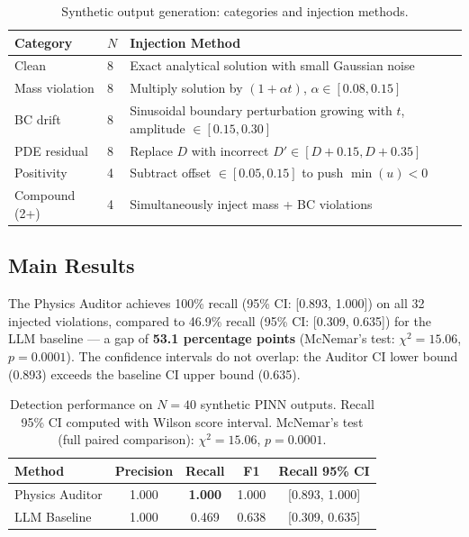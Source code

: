 \documentclass{article}
\begin{document}
\begin{table}[t]
  \caption{Synthetic output generation: categories and injection methods.}
  \label{tab:distribution}
  \centering
  \begin{tabular}{llp{7cm}}
    \toprule
    Category & $N$ & Injection Method \\
    \midrule
    Clean        & 8 & Exact analytical solution with small Gaussian noise \\
    Mass violation & 8 & Multiply solution by $(1 + \alpha t)$, $\alpha\in[0.08,0.15]$ \\
    BC drift     & 8 & Sinusoidal boundary perturbation growing with $t$, amplitude $\in[0.15,0.30]$ \\
    PDE residual & 8 & Replace $D$ with incorrect $D'\in[D+0.15, D+0.35]$ \\
    Positivity   & 4 & Subtract offset $\in[0.05, 0.15]$ to push $\min(u)<0$ \\
    Compound (2+)& 4 & Simultaneously inject mass + BC violations \\
    \bottomrule
  \end{tabular}
\end{table}

\subsection{Main Results}

The Physics Auditor achieves 100\% recall (95\% CI: [0.893, 1.000]) on all
32 injected violations, compared to 46.9\% recall (95\% CI: [0.309, 0.635])
for the LLM baseline --- a gap of \textbf{53.1 percentage points}
(McNemar's test: $\chi^2 = 15.06$, $p = 0.0001$).
The confidence intervals do not overlap: the Auditor CI lower bound (0.893)
exceeds the baseline CI upper bound (0.635).

\begin{table}[t]
  \caption{Detection performance on $N=40$ synthetic PINN outputs.
    Recall 95\% CI computed with Wilson score interval.
    McNemar's test (full paired comparison):
    $\chi^2 = 15.06$, $p = 0.0001$.}
  \label{tab:main}
  \centering
  \begin{tabular}{lcccc}
    \toprule
    Method & Precision & Recall & F1 & Recall 95\% CI \\
    \midrule
    Physics Auditor & 1.000 & \textbf{1.000} & 1.000 & [0.893, 1.000] \\
    LLM Baseline    & 1.000 & 0.469          & 0.638 & [0.309, 0.635] \\
    \bottomrule
  \end{tabular}
\end{table}
\end{document}
